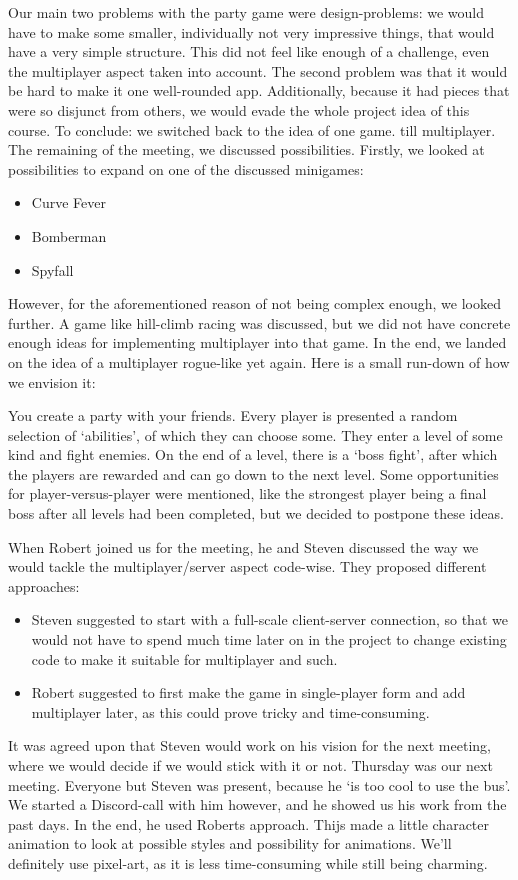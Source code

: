 \documentclass[../main.tex]{subfiles}
\begin{document}
Our main two problems with the party game were design-problems: we would have to make some smaller, individually not very impressive things, that would have a very simple structure. This did not feel like enough of a challenge, even the multiplayer aspect taken into account. The second problem was that it would be hard to make it one well-rounded app. Additionally, because it had pieces that were so disjunct from others, we would evade the whole project idea of this course. To conclude: we switched back to the idea of one game. till multiplayer. The remaining of the meeting, we discussed possibilities. Firstly, we looked at possibilities to expand on one of the discussed minigames:
\begin{itemize}
	\item Curve Fever
	\item Bomberman
	\item Spyfall
\end{itemize}
However, for the aforementioned reason of not being complex enough, we looked further. A game like hill-climb racing was discussed, but we did not have concrete enough ideas for implementing multiplayer into that game. In the end, we landed on the idea of a multiplayer rogue-like yet again. Here is a small run-down of how we envision it:

You create a party with your friends. Every player is presented a random selection of `abilities', of which they can choose some. They enter a level of some kind and fight enemies. On the end of a level, there is a `boss fight', after which the players are rewarded and can go down to the next level. Some opportunities for player-versus-player were mentioned, like the strongest player being a final boss after all levels had been completed, but we decided to postpone these ideas.

When Robert joined us for the meeting, he and Steven discussed the way we would tackle the multiplayer/server aspect code-wise. They proposed different approaches:
\begin{itemize}
	\item Steven suggested to start with a full-scale client-server connection, so that we would not have to spend much time later on in the project to change existing code to make it suitable for multiplayer and such.
	\item Robert suggested to first make the game in single-player form and add multiplayer later, as this could prove tricky and time-consuming.
\end{itemize} 
It was agreed upon that Steven would work on his vision for the next meeting, where we would decide if we would stick with it or not.
\bigbreak\noindent
Thursday was our next meeting. Everyone but Steven was present, because he `is too cool to use the bus'. We started a Discord-call with him however, and he showed us his work from the past days. In the end, he used Roberts approach. Thijs made a little character animation to look at possible styles and possibility for animations. We'll definitely use pixel-art, as it is less time-consuming while still being charming.
\end{document}
